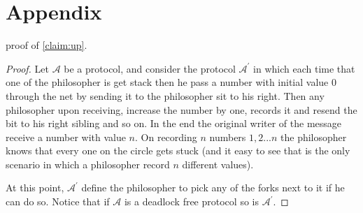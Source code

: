 \documentclass[manuscript,screen,review]{acmart}
\begin{document}
% 
\printbibliography

\section{Appendix}
proof of \cref{claim:up}. 
\begin{proof}
  Let $\mathcal{A}$ be a protocol, and consider the protocol $\mathcal{A}^{\prime}$ in which each time that one of the philosopher is get stack then he pass a number with initial value $0$ through the net by sending it to the philosopher sit to his right. Then any philosopher upon receiving, increase the number by one, records it and resend the bit to his right sibling and so on. In the end the original writer of the message receive a number with value $n$. On recording $n$ numbers $1 ,2 ... n$ the philosopher knows that every one on the circle gets stuck (and it easy to see that is the only scenario in which a philosopher record $n$ different values). 

  At this point, $\mathcal{A}^{\prime}$ define the philosopher to pick any of the forks next to it if he can do so. Notice that if $\mathcal{A}$ is a deadlock free protocol so is $\mathcal{A}^{\prime}$.         
  \end{proof}
\end{document}
